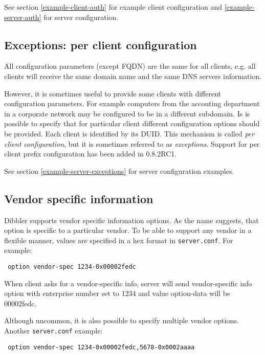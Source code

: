 See section \ref{example-client-auth} for example client configuration
and \ref{example-server-auth} for server configuration.

\subsection{Exceptions: per client configuration}
\label{feature-exceptions}
All configuration parameters (except FQDN) are the same for all
clients, e.g. all clients will receive the same domain name and the
same DNS servers information.

However, it is sometimes useful to provide some clients with different
configuration parameters. For example computers from the accouting
department in a corporate network may be configured to be in a
different subdomain. Is is possible to specify that for particular
client different configuration options should be provided. Each client
is identified by its DUID. This mechanism is called \emph{per client
  configuration}, but it is sometimes referred to as
\emph{exceptions}. Support for per client prefix configuration has
been added in 0.8.2RC1.

See section \ref{example-server-exceptions} for server configuration
examples.

\subsection{Vendor specific information}
\label{feature-vendor-spec}
Dibbler supports vendor specific information options. As the name
suggests, that option is specific to a particular vendor. To be able
to support any vendor in a flexible manner, values are specified in a
hex format in \verb+server.conf+. For example:

\begin{lstlisting}
 option vendor-spec 1234-0x00002fedc
\end{lstlisting}

When client asks for a vendor-specific info, server will send
vendor-specific info option with enterprise number set to 1234 and
value option-data will be 00002fedc.

Although uncommon, it is also possible to specify multiple vendor
options. Another \verb+server.conf+ example:

\begin{lstlisting}
 option vendor-spec 1234-0x00002fedc,5678-0x0002aaaa
\end{lstlisting}

